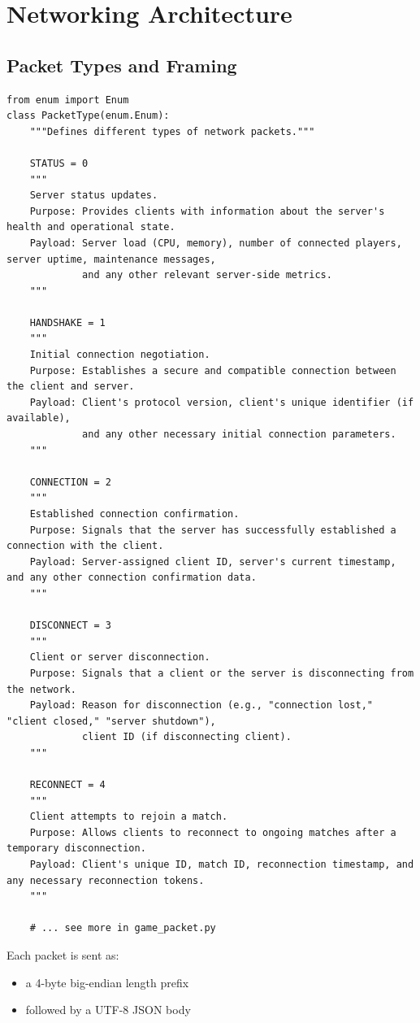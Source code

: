 \documentclass[11pt,a4paper]{article}
\begin{document}
\section{Networking Architecture}

\subsection{Packet Types and Framing}
\begin{lstlisting}[caption={\texttt{PacketType} enumeration}]
from enum import Enum
class PacketType(enum.Enum):
    """Defines different types of network packets."""

    STATUS = 0
    """
    Server status updates.
    Purpose: Provides clients with information about the server's health and operational state.
    Payload: Server load (CPU, memory), number of connected players, server uptime, maintenance messages,
             and any other relevant server-side metrics.
    """

    HANDSHAKE = 1
    """
    Initial connection negotiation.
    Purpose: Establishes a secure and compatible connection between the client and server.
    Payload: Client's protocol version, client's unique identifier (if available),
             and any other necessary initial connection parameters.
    """

    CONNECTION = 2
    """
    Established connection confirmation.
    Purpose: Signals that the server has successfully established a connection with the client.
    Payload: Server-assigned client ID, server's current timestamp, and any other connection confirmation data.
    """

    DISCONNECT = 3
    """
    Client or server disconnection.
    Purpose: Signals that a client or the server is disconnecting from the network.
    Payload: Reason for disconnection (e.g., "connection lost," "client closed," "server shutdown"),
             client ID (if disconnecting client).
    """

    RECONNECT = 4
    """
    Client attempts to rejoin a match.
    Purpose: Allows clients to reconnect to ongoing matches after a temporary disconnection.
    Payload: Client's unique ID, match ID, reconnection timestamp, and any necessary reconnection tokens.
    """

    # ... see more in game_packet.py
\end{lstlisting}

Each packet is sent as:
\begin{itemize}[nosep]
  \item a 4-byte big-endian length prefix  
  \item followed by a UTF-8 JSON body  
\end{itemize}
\end{document}
